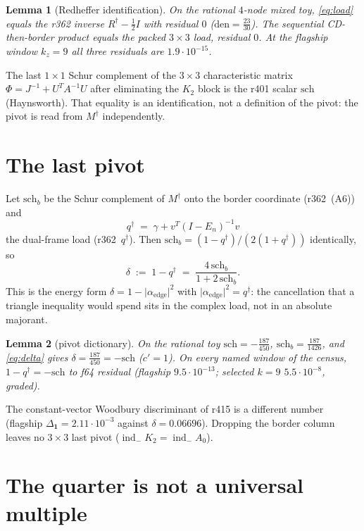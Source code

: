 \documentclass[11pt]{article}
\newtheorem{lemma}{Lemma}
\theoremstyle{remark}
\newcommand{\Rd}{R^{\dagger}}
\newcommand{\Md}{M^{\dagger}}
\newcommand{\qdag}{q^{\dagger}}
\newcommand{\sch}{\mathrm{sch}}
\newcommand{\schb}{\mathrm{sch}_{b}}
\begin{document}
\begin{lemma}[Redheffer identification]\label{lem:star}
On the rational $4$-node mixed toy,
\eqref{eq:load} equals the r362 inverse
$\Rd-\tfrac12 I$ with residual $0$
($\mathrm{den}=\tfrac{23}{30}$).
The sequential CD-then-border product equals the packed
$3\times 3$ load, residual $0$.
At the flagship window $k_{z}=9$ all three residuals
are $1.9\cdot 10^{-15}$.
\end{lemma}

The last $1\times 1$ Schur complement of the
$3\times 3$ characteristic matrix
$\Phi=J^{-1}+U^{T}A^{-1}U$ after eliminating the
$K_{2}$ block is the r401 scalar $\sch$
(Haynsworth).  That equality is an identification,
not a definition of the pivot: the pivot is read
from $\Md$ independently.

\section{The last pivot}\label{sec:piv}

Let $\schb$ be the Schur complement of $\Md$ onto the
border coordinate (r362~(A6)) and
\[
\qdag
\;=\;
\gamma+v^{T}(I-E_{n})^{-1}v
\]
the dual-frame load (r362~$q^{\dagger}$).
Then $\schb=(1-\qdag)/(2(1+\qdag))$ identically, so
\begin{equation}\label{eq:delta}
\delta
\;:=\;
1-\qdag
\;=\;
\frac{4\,\schb}{1+2\,\schb}.
\end{equation}
This is the energy form $\delta=1-\lvert\alpha_{\mathrm{edge}}\rvert^{2}$
with $\lvert\alpha_{\mathrm{edge}}\rvert^{2}=\qdag$:
the cancellation that a triangle inequality would
spend sits in the complex load, not in an absolute
majorant.

\begin{lemma}[pivot dictionary]\label{lem:piv}
On the rational toy $\sch=-\tfrac{187}{450}$,
$\schb=\tfrac{187}{1426}$, and \eqref{eq:delta}
gives $\delta=\tfrac{187}{450}=-\sch$
($c'=1$).
On every named window of the census,
$1-\qdag=-\sch$ to f64 residual
(flagship $9.5\cdot 10^{-13}$; selected $k=9$
$5.5\cdot 10^{-8}$, graded).
\end{lemma}

The constant-vector Woodbury discriminant of r415
is a different number (flagship $\Delta_{\mathbf{1}}=2.11\cdot 10^{-3}$
against $\delta=0.06696$).  Dropping the border column
leaves no $3\times 3$ last pivot
($\operatorname{ind}_{-}K_{2}=\operatorname{ind}_{-}A_{0}$).

\section{The quarter is not a universal multiple}\label{sec:qtr}
\end{document}
